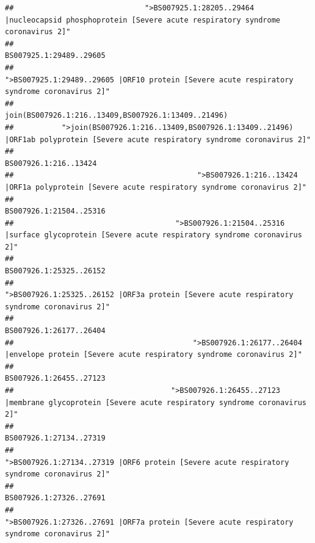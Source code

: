 \documentclass[
]{article}
\begin{document}
\begin{verbatim}
##                              ">BS007925.1:28205..29464 |nucleocapsid phosphoprotein [Severe acute respiratory syndrome coronavirus 2]" 
##                                                                                                                BS007925.1:29489..29605 
##                                            ">BS007925.1:29489..29605 |ORF10 protein [Severe acute respiratory syndrome coronavirus 2]" 
##                                                                                    join(BS007926.1:216..13409,BS007926.1:13409..21496) 
##           ">join(BS007926.1:216..13409,BS007926.1:13409..21496) |ORF1ab polyprotein [Severe acute respiratory syndrome coronavirus 2]" 
##                                                                                                                  BS007926.1:216..13424 
##                                          ">BS007926.1:216..13424 |ORF1a polyprotein [Severe acute respiratory syndrome coronavirus 2]" 
##                                                                                                                BS007926.1:21504..25316 
##                                     ">BS007926.1:21504..25316 |surface glycoprotein [Severe acute respiratory syndrome coronavirus 2]" 
##                                                                                                                BS007926.1:25325..26152 
##                                            ">BS007926.1:25325..26152 |ORF3a protein [Severe acute respiratory syndrome coronavirus 2]" 
##                                                                                                                BS007926.1:26177..26404 
##                                         ">BS007926.1:26177..26404 |envelope protein [Severe acute respiratory syndrome coronavirus 2]" 
##                                                                                                                BS007926.1:26455..27123 
##                                    ">BS007926.1:26455..27123 |membrane glycoprotein [Severe acute respiratory syndrome coronavirus 2]" 
##                                                                                                                BS007926.1:27134..27319 
##                                             ">BS007926.1:27134..27319 |ORF6 protein [Severe acute respiratory syndrome coronavirus 2]" 
##                                                                                                                BS007926.1:27326..27691 
##                                            ">BS007926.1:27326..27691 |ORF7a protein [Severe acute respiratory syndrome coronavirus 2]" 

\end{verbatim}
\end{document}
